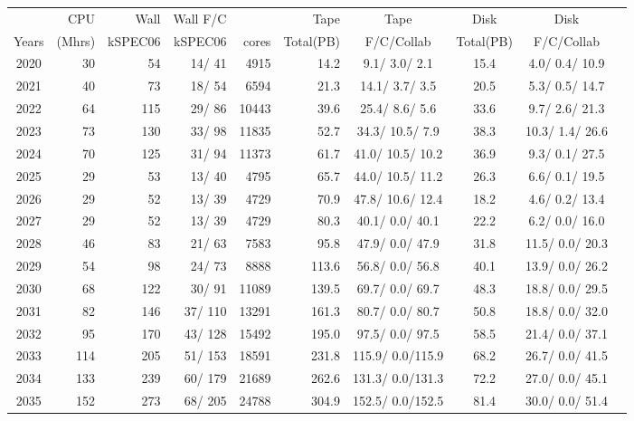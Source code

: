 \documentclass[12pt]{article}
\begin{document}
\begin{table}
\footnotesize
 \centering \begin{tabular}[h]{crrrrrcccc}
 & CPU &Wall&Wall F/C&\qquad  & Tape\qquad& Tape\qquad  & Disk\qquad  & Disk\qquad \\
Years&(Mhrs)&kSPEC06&kSPEC06&cores& Total(PB)&F/C/Collab & Total(PB) &F/C/Collab\\
\hline
2020&	  30&	  54&	  14/  41&	  4915&	     14.2&	   9.1/  3.0/  2.1&	     15.4&	   4.0/  0.4/ 10.9\\
2021&	  40&	  73&	  18/  54&	  6594&	     21.3&	  14.1/  3.7/  3.5&	     20.5&	   5.3/  0.5/ 14.7\\
2022&	  64&	 115&	  29/  86&	 10443&	     39.6&	  25.4/  8.6/  5.6&	     33.6&	   9.7/  2.6/ 21.3\\
2023&	  73&	 130&	  33/  98&	 11835&	     52.7&	  34.3/ 10.5/  7.9&	     38.3&	  10.3/  1.4/ 26.6\\
2024&	  70&	 125&	  31/  94&	 11373&	     61.7&	  41.0/ 10.5/ 10.2&	     36.9&	   9.3/  0.1/ 27.5\\
2025&	  29&	  53&	  13/  40&	  4795&	     65.7&	  44.0/ 10.5/ 11.2&	     26.3&	   6.6/  0.1/ 19.5\\
2026&	  29&	  52&	  13/  39&	  4729&	     70.9&	  47.8/ 10.6/ 12.4&	     18.2&	   4.6/  0.2/ 13.4\\
2027&	  29&	  52&	  13/  39&	  4729&	     80.3&	  40.1/  0.0/ 40.1&	     22.2&	   6.2/  0.0/ 16.0\\
2028&	  46&	  83&	  21/  63&	  7583&	     95.8&	  47.9/  0.0/ 47.9&	     31.8&	  11.5/  0.0/ 20.3\\
2029&	  54&	  98&	  24/  73&	  8888&	    113.6&	  56.8/  0.0/ 56.8&	     40.1&	  13.9/  0.0/ 26.2\\
2030&	  68&	 122&	  30/  91&	 11089&	    139.5&	  69.7/  0.0/ 69.7&	     48.3&	  18.8/  0.0/ 29.5\\
2031&	  82&	 146&	  37/ 110&	 13291&	    161.3&	  80.7/  0.0/ 80.7&	     50.8&	  18.8/  0.0/ 32.0\\
2032&	  95&	 170&	  43/ 128&	 15492&	    195.0&	  97.5/  0.0/ 97.5&	     58.5&	  21.4/  0.0/ 37.1\\
2033&	 114&	 205&	  51/ 153&	 18591&	    231.8&	 115.9/  0.0/115.9&	     68.2&	  26.7/  0.0/ 41.5\\
2034&	 133&	 239&	  60/ 179&	 21689&	    262.6&	 131.3/  0.0/131.3&	     72.2&	  27.0/  0.0/ 45.1\\
2035&	 152&	 273&	  68/ 205&	 24788&	    304.9&	 152.5/  0.0/152.5&	     81.4&	  30.0/  0.0/ 51.4\\

\end{tabular}
\end{table}
\end{document}
